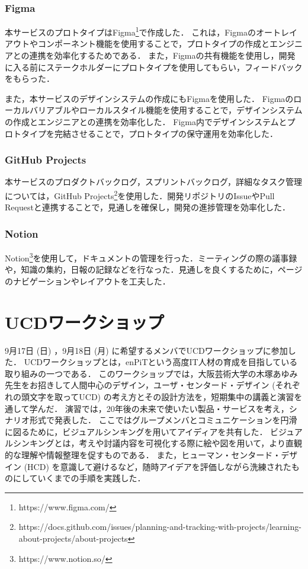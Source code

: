 \subsubsection{Figma}
本サービスのプロトタイプはFigma\footnote{https://www.figma.com/}で作成した．
これは，Figmaのオートレイアウトやコンポーネント機能を使用することで，プロトタイプの作成とエンジニアとの連携を効率化するためである．
また，Figmaの共有機能を使用し，開発に入る前にステークホルダーにプロトタイプを使用してもらい，フィードバックをもらった．

また，本サービスのデザインシステムの作成にもFigmaを使用した．
Figmaのローカルバリアブルやローカルスタイル機能を使用することで，デザインシステムの作成とエンジニアとの連携を効率化した．
Figma内でデザインシステムとプロトタイプを完結させることで，プロトタイプの保守運用を効率化した．

\subsubsection{GitHub Projects}
本サービスのプロダクトバックログ，スプリントバックログ，詳細なタスク管理については，GitHub Projects\footnote{https://docs.github.com/issues/planning-and-tracking-with-projects/learning-about-projects/about-projects}を使用した．開発リポジトリのIssueやPull Requestと連携することで，見通しを確保し，開発の進捗管理を効率化した．

\subsubsection{Notion}
Notion\footnote{https://www.notion.so/}を使用して，ドキュメントの管理を行った．ミーティングの際の議事録や，知識の集約，日報の記録などを行なった．見通しを良くするために，ページのナビゲーションやレイアウトを工夫した．

\section{UCDワークショップ}
9月17日 (日) ，9月18日 (月) に希望するメンバでUCDワークショップに参加した．
UCDワークショップとは，enPiTという高度IT人材の育成を目指している取り組みの一つである．
このワークショップでは，大阪芸術大学の木塚あゆみ先生をお招きして人間中心のデザイン，ユーザ・センタード・デザイン (それぞれの頭文字を取ってUCD) の考え方とその設計方法を，短期集中の講義と演習を通して学んだ．
演習では，20年後の未来で使いたい製品・サービスを考え，シナリオ形式で発表した．
ここではグループメンバとコミュニケーションを円滑に図るために，ビジュアルシンキングを用いてアイディアを共有した．
ビジュアルシンキングとは，考えや討議内容を可視化する際に絵や図を用いて，より直観的な理解や情報整理を促すものである\cite{visual}．
また，ヒューマン・センタード・デザイン (HCD) を意識して避けるなど，随時アイデアを評価しながら洗練されたものにしていくまでの手順を実践した．


